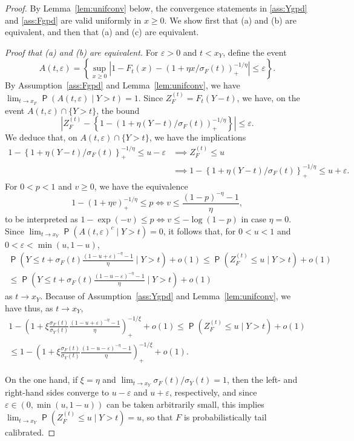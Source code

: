 \documentclass[12pt]{article}
\newcommand{\Q}{\operatorname{\mathsf{P}}}
\newcommand{\1}{\mathbf{1}} %
\newcommand{\eps}{\varepsilon}
\newcommand{\ZFt}{Z_{F}^{(t)}} %
\theoremstyle{definition}
\begin{document}
\begin{proof}
By Lemma~\ref{lem:unifconv} below, the convergence statements in \ref{ass:Ygpd} and \ref{ass:Fgpd} are valid uniformly in $x \ge 0$. We show first that (a) and (b) are equivalent, and then that (a) and (c) are equivalent.

\noindent \emph{Proof that (a) and (b) are equivalent.}
For $\eps > 0$ and $t < x_Y$, define the event
\[
	A(t,\eps)
	= \left\{ \sup_{x \ge 0} \left| 1-F_t(x) - \left(1+\eta x/\sigma_F(t)\right)_+^{-1/\eta} \right| \le \eps \right\}.
\]
By Assumption~\ref{ass:Fgpd} and Lemma~\ref{lem:unifconv}, we have $\lim_{t \to x_F} \Q(A(t, \eps) \mid Y > t) = 1$. Since $\ZFt = F_t(Y-t)$, we have, on the event $A(t,\eps) \cap \{Y > t\}$, the bound
\[
	\left|
		\ZFt - \left\{1 - \left(1+\eta (Y-t)/\sigma_F(t)\right)_+^{-1/\eta}\right\}
	\right| \le \eps.
\]
We deduce that, on $A(t, \eps) \cap \{Y > t\}$, we have the implications
\begin{align*}
	1 - \left\{1+\eta (Y-t)/\sigma_F(t)\right\}_+^{-1/\eta}
	\le u - \eps
	&\implies
	\ZFt \le u \\
	&\implies 
	1 - \left\{1+\eta (Y-t)/\sigma_F(t)\right\}_+^{-1/\eta}
	\le u + \eps.
\end{align*}
For $0 < p < 1$ and $v \ge 0$, we have the equivalence
\[ 
	1 - (1+\eta v)_+^{-1/\eta} \le p
	\iff
	v \le \frac{(1-p)^{-\eta} - 1}{\eta},
\]
to be interpreted as $1 - \exp(-v) \le p \iff v \le -\log(1-p)$ in case $\eta = 0$. Since $\lim_{t \to x_Y} \Q(A(t,\eps)^c \mid Y > t) = 0$, it follows that, for $0 < u < 1$ and $0 < \eps < \min(u, 1-u)$,
\begin{multline*}
	\Q\left( Y \le t + \sigma_F(t) \frac{(1-u+\eps)^{-\eta}-1}{\eta} \mid Y > t \right)
	+ o(1)
	\le \Q\left(\ZFt \le u \mid Y > t\right) + o(1) \\
	\le \Q\left( Y \le t + \sigma_F(t) \frac{(1-u-\eps)^{-\eta}-1}{\eta} \mid Y > t \right)
	+ o(1)
\end{multline*}
as $t \to x_Y$.
Because of Assumption~\ref{ass:Ygpd} and Lemma~\ref{lem:unifconv}, we have thus, as $t \to x_Y$,
\begin{multline*}
	1 - \left(1 + \xi \frac{\sigma_F(t)}{\sigma_Y(t)} \frac{(1-u+\eps)^{-\eta}-1}{\eta} \right)_+^{-1/\xi} + o(1)
	\le \Q\left(\ZFt \le u \mid Y > t\right) + o(1) \\
	\le
	1 - \left(1 + \xi \frac{\sigma_F(t)}{\sigma_Y(t)} \frac{(1-u-\eps)^{-\eta}-1}{\eta} \right)_+^{-1/\xi} + o(1).
\end{multline*}

On the one hand, if $\xi = \eta$ and $\lim_{t \to x_Y} \sigma_F(t)/\sigma_Y(t) = 1$, then the left- and right-hand sides converge to $u-\eps$ and $u+\eps$, respectively, and since $\eps \in (0, \min(u,1-u))$ can be taken arbitrarily small, this implies $\lim_{t \to x_Y} \Q(\ZFt \le u \mid Y > t) = u$, so that $F$ is probabilistically tail calibrated.


\end{proof}
\end{document}
